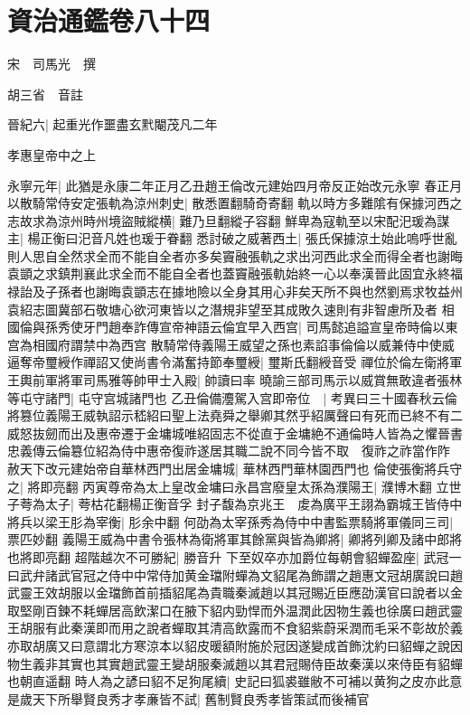 \chapter{資治通鑑卷八十四}
宋　司馬光　撰

胡三省　音註

晉紀六|{
	起重光作噩盡玄黓閹茂凡二年}


孝惠皇帝中之上

永寧元年|{
	此猶是永康二年正月乙丑趙王倫改元建始四月帝反正始改元永寧}
春正月以散騎常侍安定張軌為涼州刺史|{
	散悉置翻騎奇寄翻}
軌以時方多難隂有保據河西之志故求為涼州時州境盜賊縱横|{
	難乃旦翻縱子容翻}
鮮卑為寇軌至以宋配汜瑗為謀主|{
	楊正衡曰汜音凡姓也瑗于眷翻}
悉討破之威著西土|{
	張氏保據涼土始此嗚呼世亂則人思自全然求全而不能自全者亦多矣竇融張軌之求出河西此求全而得全者也謝晦袁顗之求鎮荆襄此求全而不能自全者也蓋竇融張軌始終一心以奉漢晉此固宜永終福禄詒及子孫者也謝晦袁顗志在據地險以全身其用心非矣天所不與也然劉焉求牧益州袁紹志圖冀部石敬塘心欲河東皆以之潛規非望至其成敗久速則有非智慮所及者}
相國倫與孫秀使牙門趙奉詐傳宣帝神語云倫宜早入西宫|{
	司馬懿追謚宣皇帝時倫以東宫為相國府謂禁中為西宫}
散騎常侍義陽王威望之孫也素諂事倫倫以威兼侍中使威逼奪帝璽綬作禪詔又使尚書令滿奮持節奉璽綬|{
	璽斯氏翻綬音受}
禪位於倫左衛將軍王輿前軍將軍司馬雅等帥甲士入殿|{
	帥讀曰率}
曉諭三部司馬示以威賞無敢違者張林等屯守諸門|{
	屯守宫城諸門也}
乙丑倫備灋駕入宫即帝位　|{
	考異曰三十國春秋云倫將篡位義陽王威執詔示嵇紹曰聖上法堯舜之舉卿其然乎紹厲聲曰有死而已終不有二威怒抜劒而出及惠帝遷于金墉城唯紹固志不從直于金墉絶不通倫時人皆為之懼晉書忠義傳云倫簒位紹為侍中惠帝復祚遂居其職二說不同今皆不取　復祚之祚當作阼}
赦天下改元建始帝自華林西門出居金墉城|{
	華林西門華林園西門也}
倫使張衡將兵守之|{
	將即亮翻}
丙寅尊帝為太上皇改金墉曰永昌宫廢皇太孫為濮陽王|{
	濮博木翻}
立世子荂為太子|{
	荂枯花翻楊正衡音孚}
封子馥為京兆王　䖍為廣平王詡為霸城王皆侍中將兵以梁王肜為宰衡|{
	肜余中翻}
何劭為太宰孫秀為侍中中書監票騎將軍儀同三司|{
	票匹妙翻}
義陽王威為中書令張林為衛將軍其餘黨與皆為卿將|{
	卿將列卿及諸中郎將也將即亮翻}
超階越次不可勝紀|{
	勝音升}
下至奴卒亦加爵位每朝會貂蟬盈座|{
	武冠一曰武弁諸武官冠之侍中中常侍加黄金璫附蟬為文貂尾為飾謂之趙惠文冠胡廣說曰趙武靈王效胡服以金璫飾首前插貂尾為貴職秦滅趙以其冠賜近臣應劭漢官曰說者以金取堅剛百鍊不耗蟬居高飲潔口在腋下貂内勁悍而外温潤此因物生義也徐廣曰趙武靈王胡服有此秦漢即而用之說者蟬取其清高飲露而不食貂紫蔚采潤而毛采不彰故於義亦取胡廣又曰意謂北方寒涼本以貂皮暖額附施於冠因遂變成首飾沈約曰貂蟬之說因物生義非其實也其實趙武靈王變胡服秦滅趙以其君冠賜侍臣故秦漢以來侍臣有貂蟬也朝直遥翻}
時人為之諺曰貂不足狗尾續|{
	史記曰狐裘雖敝不可補以黄狗之皮亦此意}
是歲天下所舉賢良秀才孝亷皆不試|{
	舊制賢良秀孝皆策試而後補官}

